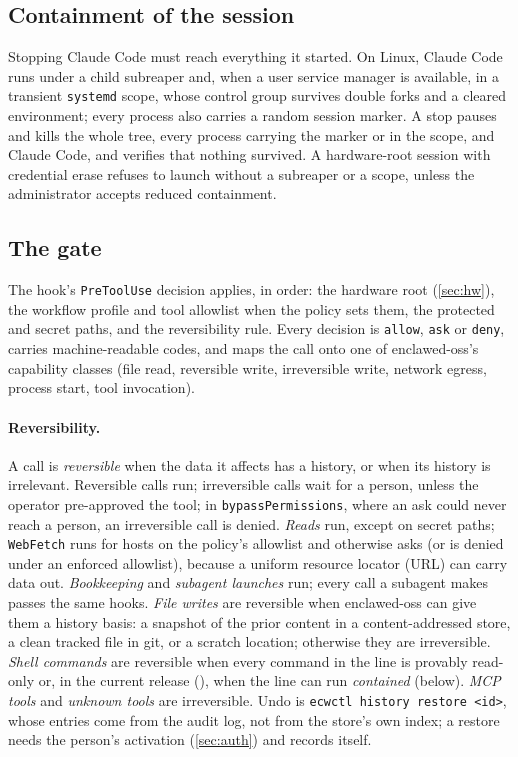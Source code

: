 \documentclass[11pt]{article}
\begin{document}
\subsection{Containment of the session}
\label{sec:containment}

Stopping Claude Code must reach everything it started. On Linux, Claude
Code runs under a child subreaper and, when a user service manager is
available, in a transient \texttt{systemd} scope, whose control group
survives double forks and a cleared environment; every process also
carries a random session marker. A stop pauses and kills the whole tree,
every process carrying the marker or in the scope, and Claude Code, and
verifies that nothing survived. A hardware-root session with credential
erase refuses to launch without a subreaper or a scope, unless the
administrator accepts reduced containment.

\subsection{The gate}
\label{sec:gate}

The hook's \texttt{PreToolUse} decision applies, in order: the hardware
root (\cref{sec:hw}), the workflow profile and tool allowlist when the
policy sets them, the protected and secret paths, and the reversibility
rule. Every decision is \texttt{allow}, \texttt{ask} or \texttt{deny},
carries machine-readable codes, and maps the call onto one of
enclawed-oss's capability classes (file read, reversible write,
irreversible write, network egress, process start, tool invocation).

\paragraph{Reversibility.} A call is \emph{reversible} when the data it
affects has a history, or when its history is irrelevant. Reversible
calls run; irreversible calls wait for a person, unless the operator
pre-approved the tool; in \texttt{bypassPermissions}, where an ask could
never reach a person, an irreversible call is denied. \emph{Reads} run,
except on secret paths; \texttt{WebFetch} runs for hosts on the policy's
allowlist and otherwise asks (or is denied under an enforced allowlist),
because a uniform resource locator (URL) can carry data out.
\emph{Bookkeeping} and \emph{subagent launches} run; every call a
subagent makes passes the same hooks. \emph{File writes} are reversible
when enclawed-oss can give them a history basis: a snapshot of the prior
content in a content-addressed store, a clean tracked file in git, or a
scratch location; otherwise they are irreversible. \emph{Shell commands}
are reversible when every command in the line is provably read-only or,
in the current release (\ReplayKit{}), when the line can run
\emph{contained} (below). \emph{MCP tools} and \emph{unknown tools} are
irreversible. Undo is \texttt{ecwctl history restore <id>}, whose
entries come from the audit log, not from the store's own index; a
restore needs the person's activation (\cref{sec:auth}) and records
itself.
\end{document}
